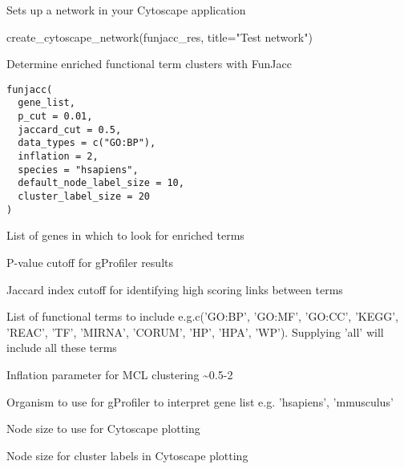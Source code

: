 \documentclass[a4paper]{book}
\begin{document}
%
\begin{Value}
Sets up a network in your Cytoscape application
\end{Value}
%
\begin{Examples}
\begin{ExampleCode}
create_cytoscape_network(funjacc_res, title="Test network")
\end{ExampleCode}
\end{Examples}
%
\begin{Description}
Determine enriched functional term clusters with FunJacc
\end{Description}
%
\begin{Usage}
\begin{verbatim}
funjacc(
  gene_list,
  p_cut = 0.01,
  jaccard_cut = 0.5,
  data_types = c("GO:BP"),
  inflation = 2,
  species = "hsapiens",
  default_node_label_size = 10,
  cluster_label_size = 20
)
\end{verbatim}
\end{Usage}
%
\begin{Arguments}
\begin{ldescription}
\item[\code{gene\_list}] List of genes in which to look for enriched terms

\item[\code{p\_cut}] P-value cutoff for gProfiler results

\item[\code{jaccard\_cut}] Jaccard index cutoff for identifying high scoring links between terms

\item[\code{data\_types}] List of functional terms to include e.g.c('GO:BP', 'GO:MF', 'GO:CC', 'KEGG', 'REAC', 'TF', 'MIRNA', 'CORUM', 'HP', 'HPA', 'WP'). Supplying 'all' will include all these terms

\item[\code{inflation}] Inflation parameter for MCL clustering \textasciitilde{}0.5-2

\item[\code{species}] Organism to use for gProfiler to interpret gene list e.g. 'hsapiens', 'mmusculus'

\item[\code{default\_node\_label\_size}] Node size to use for Cytoscape plotting

\item[\code{cluster\_label\_size}] Node size for cluster labels in Cytoscape plotting
\end{ldescription}
\end{Arguments}
\end{document}
